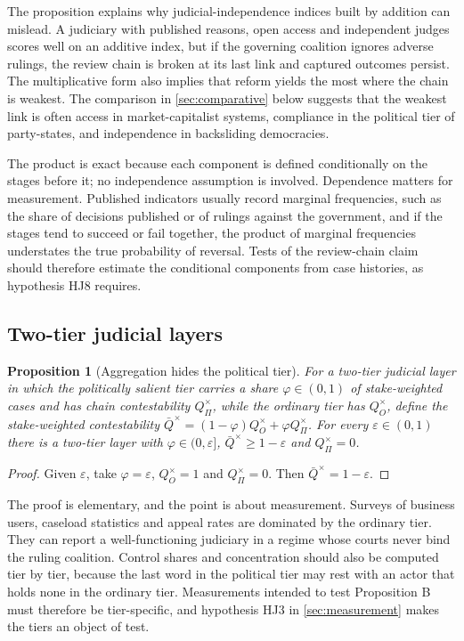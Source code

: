 \documentclass[11pt,letterpaper]{article}
\newtheorem{proposition}[theorem]{Proposition}
\theoremstyle{definition}
\theoremstyle{remark}
\begin{document}
The proposition explains why judicial-independence indices built by addition can mislead. A judiciary with published reasons, open access and independent judges scores well on an additive index, but if the governing coalition ignores adverse rulings, the review chain is broken at its last link and captured outcomes persist. The multiplicative form also implies that reform yields the most where the chain is weakest. The comparison in \cref{sec:comparative} below suggests that the weakest link is often access in market-capitalist systems, compliance in the political tier of party-states, and independence in backsliding democracies.

The product is exact because each component is defined conditionally on the stages before it; no independence assumption is involved. Dependence matters for measurement. Published indicators usually record marginal frequencies, such as the share of decisions published or of rulings against the government, and if the stages tend to succeed or fail together, the product of marginal frequencies understates the true probability of reversal. Tests of the review-chain claim should therefore estimate the conditional components from case histories, as hypothesis HJ8 requires.

\subsection{Two-tier judicial layers}

\begin{proposition}[Aggregation hides the political tier]
\label{prop:judicial-power:dualstate}
For a two-tier judicial layer in which the politically salient tier carries a share $\varphi\in(0,1)$ of stake-weighted cases and has chain contestability $Q^{\times}_{\Pi}$, while the ordinary tier has $Q^{\times}_{O}$, define the stake-weighted contestability $\bar Q^{\times}=(1-\varphi)Q^{\times}_O+\varphi Q^{\times}_\Pi$. For every $\varepsilon\in(0,1)$ there is a two-tier layer with $\varphi\in(0,\varepsilon]$, $\bar Q^{\times}\ge 1-\varepsilon$ and $Q^{\times}_\Pi=0$.
\end{proposition}

\begin{proof}
Given $\varepsilon$, take $\varphi=\varepsilon$, $Q^{\times}_O=1$ and $Q^{\times}_\Pi=0$. Then $\bar Q^{\times}=1-\varepsilon$.
\end{proof}

The proof is elementary, and the point is about measurement. Surveys of business users, caseload statistics and appeal rates are dominated by the ordinary tier. They can report a well-functioning judiciary in a regime whose courts never bind the ruling coalition. Control shares and concentration should also be computed tier by tier, because the last word in the political tier may rest with an actor that holds none in the ordinary tier. Measurements intended to test Proposition B must therefore be tier-specific, and hypothesis HJ3 in \cref{sec:measurement} makes the tiers an object of test.
\end{document}
